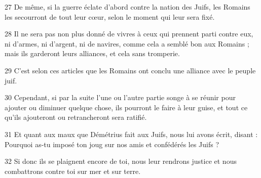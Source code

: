 \par 27 De même, si la guerre éclate d'abord contre la nation des Juifs, les Romains les secourront de tout leur cœur, selon le moment qui leur sera fixé.
\par 28 Il ne sera pas non plus donné de vivres à ceux qui prennent parti contre eux, ni d'armes, ni d'argent, ni de navires, comme cela a semblé bon aux Romains ; mais ils garderont leurs alliances, et cela sans tromperie.
\par 29 C'est selon ces articles que les Romains ont conclu une alliance avec le peuple juif.
\par 30 Cependant, si par la suite l'une ou l'autre partie songe à se réunir pour ajouter ou diminuer quelque chose, ils pourront le faire à leur guise, et tout ce qu'ils ajouteront ou retrancheront sera ratifié.
\par 31 Et quant aux maux que Démétrius fait aux Juifs, nous lui avons écrit, disant : Pourquoi as-tu imposé ton joug sur nos amis et confédérés les Juifs ?
\par 32 Si donc ils se plaignent encore de toi, nous leur rendrons justice et nous combattrons contre toi sur mer et sur terre.


